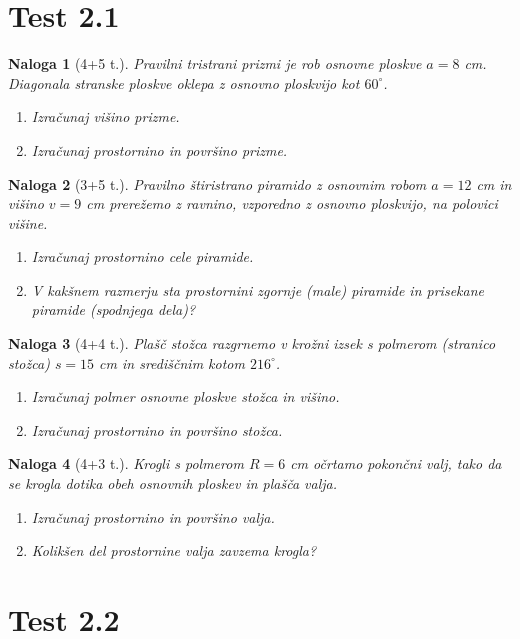 \documentclass[a4paper,12pt]{article}
\theoremstyle{naloga}
\newtheorem{naloga}{Naloga}[section]
\begin{document}
\section{Test 2.1}

\begin{naloga}[4+5 t.]
Pravilni tristrani prizmi je rob osnovne ploskve $a=8$ cm. Diagonala stranske ploskve oklepa z osnovno ploskvijo kot $60^{\circ}$.
\begin{enumerate}
\item Izračunaj višino prizme.
\item Izračunaj prostornino in površino prizme.
\end{enumerate}
\end{naloga}

\begin{naloga}[3+5 t.]
Pravilno štiristrano piramido z osnovnim robom $a=12$ cm in višino $v=9$ cm prerežemo z ravnino, vzporedno z osnovno ploskvijo, na polovici višine.
\begin{enumerate}
\item Izračunaj prostornino cele piramide.
\item V kakšnem razmerju sta prostornini zgornje (male) piramide in prisekane piramide (spodnjega dela)?
\end{enumerate}
\end{naloga}

\begin{naloga}[4+4 t.]
Plašč stožca razgrnemo v krožni izsek s polmerom (stranico stožca) $s=15$ cm in središčnim kotom $216^{\circ}$.
\begin{enumerate}
\item Izračunaj polmer osnovne ploskve stožca in višino.
\item Izračunaj prostornino in površino stožca.
\end{enumerate}
\end{naloga}

\begin{naloga}[4+3 t.]
Krogli s polmerom $R=6$ cm očrtamo pokončni valj, tako da se krogla dotika obeh osnovnih ploskev in plašča valja.
\begin{enumerate}
\item Izračunaj prostornino in površino valja.
\item Kolikšen del prostornine valja zavzema krogla?
\end{enumerate}
\end{naloga}

\section{Test 2.2}
\end{document}
